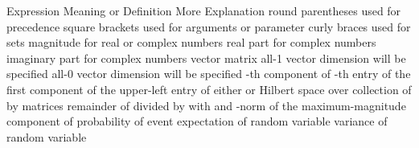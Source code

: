 \starttitle [title={Notation}]

\starttable[|l|l|l|] \HL
\NC Expression \VL Meaning or Definition \VL More Explanation \SR \HL
\NC {} \VL round parentheses \VL used for precedence \AR \HL
\NC {} \VL square brackets \VL used for arguments or parameter \AR \HL
\NC {} \VL curly braces \VL used for sets \AR \HL
\NC {} \VL magnitude \VL for real or complex numbers \AR \HL
\NC {} \VL real part \VL for complex numbers \AR \HL
\NC {} \VL imaginary part \VL for complex numbers \AR \HL
\NC {} \VL vector \VL \AR \HL
\NC {} \VL matrix \VL \AR \HL
\NC {} \VL all-1 vector \VL dimension will be specified \AR \HL
\NC {} \VL all-0 vector \VL dimension will be specified \AR \HL
\NC {} \VL {}-th component of  \VL \AR \HL
\NC {} \VL {}-th entry of  \VL \AR \HL
\NC {} \VL the first component of  \VL  \AR \HL
\NC {} \VL the upper-left entry of  \VL  \AR \HL
\NC {} \VL either  or  \VL  \AR \HL
\NC {} \VL Hilbert space  over  \VL  \AR \HL
\NC {} \VL collection of  by  matrices \VL  \AR \HL
\NC {} \VL remainder of  divided by  \VL with  and  \AR \HL
\NC {} \VL {}-norm of  \VL {} \AR \HL
\NC {} \VL the maximum-magnitude \VL  \AR
\NC  \VL component of  \VL  \AR \HL
\NC {} \VL probability of event  \VL  \AR \HL
\NC {} \VL expectation of random variable  \VL  \AR \HL
\NC {} \VL variance of random variable  \VL  \AR \HL
\stoptable

\stopchapter
